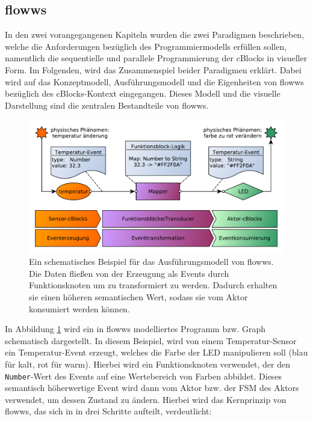 \subsection{flowws}
In den zwei vorangegangenen Kapiteln wurden die zwei Paradigmen beschrieben, welche die Anforderungen bezüglich des Programmiermodells erfüllen sollen, namentlich die sequentielle und parallele Programmierung der cBlocks in visueller Form. Im Folgenden, wird das Zusammenspiel beider Paradigmen erklärt. Dabei wird auf das Konzeptmodell, Ausführungsmodell und die Eigenheiten von flowws bezüglich des cBlocks-Kontext eingegangen. Dieses Modell und die visuelle Darstellung sind die zentralen Bestandteile von flowws.

\begin{figure}[h]
  \centering
  \includegraphics[width=1\textwidth]{bilder/chapter4/chapter4_2/flowwsschematicexample.pdf}
  \caption{Ein schematisches Beispiel für das Ausführungsmodell von flowws. Die Daten fließen von der Erzeugung als Events durch Funktionsknoten um zu transformiert zu werden. Dadurch erhalten sie einen höheren semantischen Wert, sodass sie vom Aktor konsumiert werden können.}
  \label{fig:beispielflowws}
\end{figure}

In Abbildung \ref{fig:beispielflowws} wird ein in flowws modelliertes Programm bzw. Graph schematisch dargestellt.  In diesem Beispiel, wird von einem Temperatur-Sensor ein Temperatur-Event erzeugt, welches die Farbe der LED manipulieren soll (blau für kalt, rot für warm). Hierbei wird ein Funktionsknoten verwendet, der den \texttt{Number}-Wert des Events auf eine Wertebereich von Farben abbildet. Dieses semantisch höherwertige Event wird dann vom Aktor bzw. der \ac{FSM} des Aktors verwendet, um dessen Zustand zu ändern. Hierbei wird das Kernprinzip von flowws, das sich in in drei Schritte aufteilt, verdeutlicht:

